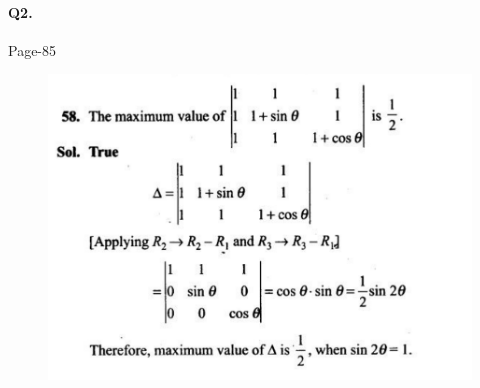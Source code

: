 \documentclass{article}
\begin{document}
\paragraph{Q2.}
\begin{flushright}
Page-85
\end{flushright}
\begin{figure}[H]
    \includegraphics[scale=0.5]{determinants_l5_ps_3.png}
\end{figure}
\clearpage
\end{document}
